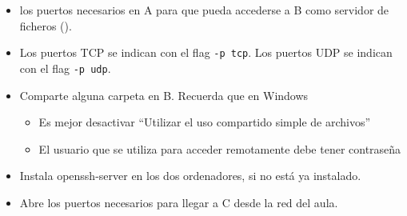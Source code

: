 \begin{homeworkProblem}
  \begin{itemize}
  \item los puertos necesarios en A para que pueda accederse a B como servidor de ficheros ().
  \item  Los puertos TCP se indican con el flag \texttt{-p tcp}. Los puertos UDP se indican con el flag \texttt{-p udp}.
    
  \item Comparte alguna carpeta en B. Recuerda que en Windows
    \begin{itemize}
    \item Es mejor desactivar “Utilizar el uso compartido simple de archivos”
    \item  El usuario que se utiliza para acceder remotamente debe tener contraseña
    \end{itemize}

  \end{itemize}

\end{homeworkProblem}


\begin{homeworkProblem}
  \begin{itemize}
  \item Instala openssh-server en los dos ordenadores, si no está ya instalado.
  \item Abre los puertos necesarios para llegar a C desde la red del aula.
  \end{itemize}

\end{homeworkProblem}


